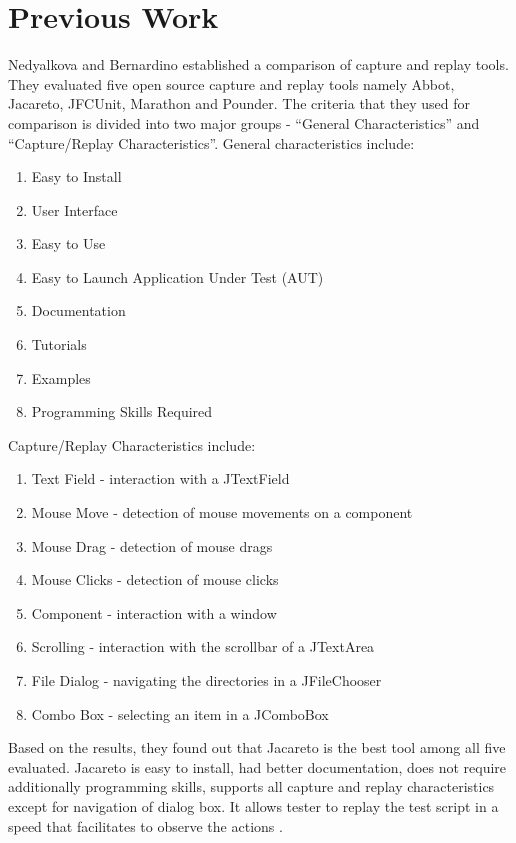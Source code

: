 \documentclass[12pt,journal]{IEEEtran}
\begin{document}
\section{Previous Work}
Nedyalkova and  Bernardino established a comparison of capture and replay tools. They evaluated five open source capture and replay tools namely Abbot, Jacareto, JFCUnit, Marathon and Pounder. The criteria that they used for comparison is divided into two major groups - ``General Characteristics'' and ``Capture/Replay Characteristics''. General characteristics include:
\begin{enumerate}
\item Easy to Install
\item User Interface
\item Easy to Use
\item Easy to Launch Application Under Test (AUT)
\item Documentation
\item Tutorials
\item Examples
\item Programming Skills Required
\end{enumerate}
Capture/Replay Characteristics include:
\begin{enumerate}
\item Text Field - interaction with a JTextField
\item Mouse Move - detection of mouse movements on a component
\item Mouse Drag - detection of mouse drags
\item Mouse Clicks - detection of mouse clicks
\item Component - interaction with a window
\item Scrolling - interaction with the scrollbar of a JTextArea
\item File Dialog - navigating the directories in a JFileChooser
\item Combo Box - selecting an item in a JComboBox
\end{enumerate}
Based on the results, they found out that Jacareto is the best tool among all five evaluated. Jacareto is easy to install, had better documentation, does not require additionally programming skills, supports all capture and replay characteristics except for navigation of dialog box. It allows tester to replay the test script in a speed that facilitates to observe the actions \cite{Nedyalkova:2013:OSC:2494444.2494464}.
\end{document}
